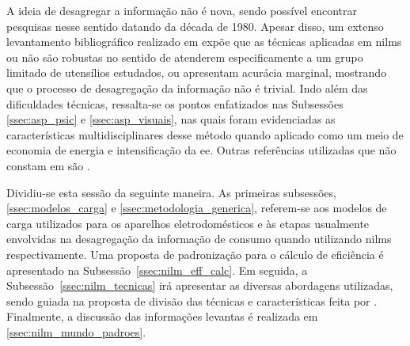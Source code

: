A ideia de desagregar a informação não é nova, sendo possível
encontrar pesquisas nesse sentido datando da década de 1980. Apesar
disso, um extenso levantamento bibliográfico
\cite{nilm_hart_1992_8,nilm_bouloutas_viterbi_ext_1991_11,
nilm_hart_fsm_viterbi_1993_12,nilm_norford_leeb_medianfilt_1996_13,
nilm_cole_data_extraction_1998_14,nilm_cole_extra_info_surge_1998_15,
nilm_powers_15minsamp_1991_16,nilm_farinaccio_16ssamp_1999_17,
nilm_marceau_16ssamp_improved_1999_18,nilm_baranski_genetic_base_2003_19,
nilm_baranski_genetic_detalhado_2004_20,nilm_baranski_summary_2004_21,
nilm_matthews_overview_2008_22,nilm_laughman_continuous_variables_2003_9,
nilm_leeb_spectral_envelope_1995_23,nilm_lee_variable_speed_estimation_2005_24,
nilm_wichakool_2009_25,nilm_shaw_2008_26,nilm_srinivasan_nn_2006_27,
nilm_akbar_2007_28,nilm_patel_2007_29,nilm_gupta_patel_2010_30,
nilm_sultanem_1991_10,nilm_chan_2000_31,nilm_lee_2004_32,nilm_lam_2007_33,
nilm_liang_pt1_2010_34,nilm_suzuki_2011_35,nilm_berges_2008_7,
nilm_berges_2009_36,2010_nilm_melhorando_pph_usa_37,
nilm_liang_pt2_2010_40} realizado em \citet*{nilm_zeifman_review_2011}
expõe que as técnicas aplicadas em \glspl{nilm} ou não são robustas no
sentido de atenderem especificamente a um grupo limitado de utensílios
estudados, ou apresentam acurácia marginal, mostrando que o processo
de desagregação da informação não é trivial. Indo além das
dificuldades técnicas, ressalta-se os pontos enfatizados nas
Subsessões \ref{ssec:asp_psic} e \ref{ssec:asp_visuais}, nas quais
foram evidenciadas as características multidisciplinares desse método
quando aplicado como um meio de economia de energia e intensificação
da \gls{ee}. Outras referências utilizadas que não constam em
\cite{nilm_zeifman_review_2011} são
\cite{nilm_zeifman_statistical_approach_resumo_2013,
nilm_bergman_distribuido_2011,
nilm_genetic_2013,nilm_zeifman_2011,nilm_patel_2011,
nilm_zeifman_nonintrusive_2011,nilm_ihome_tomek_2012,
wavelet_transients_2009,nilm_berges_multisensor_2010,
nilm_coppe_nascimento,nilm_itajuba_rodrigues}.

Dividiu-se esta sessão da seguinte maneira. As primeiras subsessões,
\ref{ssec:modelos_carga} e \ref{ssec:metodologia_generica}, referem-se
aos modelos de carga utilizados para os aparelhos eletrodomésticos e às
etapas usualmente envolvidas na desagregação da informação de
consumo quando utilizando \glspl{nilm} respectivamente. Uma
proposta de padronização para o cálculo de eficiência é apresentado na
Subsessão~\ref{ssec:nilm_eff_calc}. Em seguida, a
Subsessão~\ref{ssec:nilm_tecnicas} irá apresentar as diversas
abordagens utilizadas, sendo guiada na proposta de divisão das
técnicas e características feita por \cite{nilm_zeifman_review_2011}.
Finalmente, a discussão das informações levantas é realizada em
\ref{ssec:nilm_mundo_padroes}.

